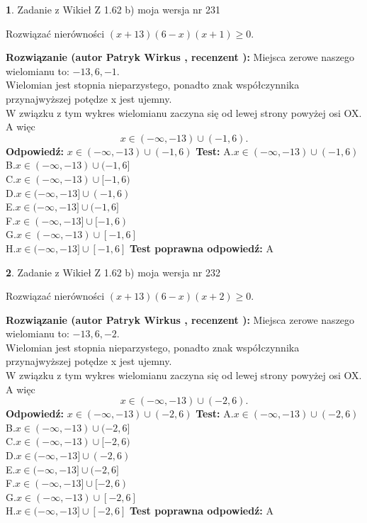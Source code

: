 \documentclass[12pt, a4paper]{article}
\theoremstyle{definition} %
\newtheorem{zad}{}
\newcommand{\zadStart}[1]{\begin{zad}#1\newline}
\newcommand{\zadStop}{\end{zad}}
\newcommand{\rozwStart}[2]{\noindent \textbf{Rozwiązanie (autor #1 , recenzent #2): }\newline}
\newcommand{\rozwStop}{\newline}
\newcommand{\odpStart}{\noindent \textbf{Odpowiedź:}\newline}
\newcommand{\odpStop}{\newline}
\newcommand{\testStart}{\noindent \textbf{Test:}\newline}
\newcommand{\testStop}{\newline}
\newcommand{\kluczStart}{\noindent \textbf{Test poprawna odpowiedź:}\newline}
\newcommand{\kluczStop}{\newline}
\begin{document}
\zadStart{Zadanie z Wikieł Z 1.62 b) moja wersja nr 231}

Rozwiązać nierówności $(x+13)(6-x)(x+1)\ge0$.
\zadStop
\rozwStart{Patryk Wirkus}{}
Miejsca zerowe naszego wielomianu to: $-13, 6, -1$.\\
Wielomian jest stopnia nieparzystego, ponadto znak współczynnika przy\linebreak najwyższej potędze x jest ujemny.\\ W związku z tym wykres wielomianu zaczyna się od lewej strony powyżej osi OX. A więc $$x \in (-\infty,-13) \cup (-1,6).$$
\rozwStop
\odpStart
$x \in (-\infty,-13) \cup (-1,6)$
\odpStop
\testStart
A.$x \in (-\infty,-13) \cup (-1,6)$\\
B.$x \in (-\infty,-13) \cup (-1,6]$\\
C.$x \in (-\infty,-13) \cup [-1,6)$\\
D.$x \in (-\infty,-13] \cup (-1,6)$\\
E.$x \in (-\infty,-13] \cup (-1,6]$\\
F.$x \in (-\infty,-13] \cup [-1,6)$\\
G.$x \in (-\infty,-13) \cup [-1,6]$\\
H.$x \in (-\infty,-13] \cup [-1,6]$
\testStop
\kluczStart
A
\kluczStop



\zadStart{Zadanie z Wikieł Z 1.62 b) moja wersja nr 232}

Rozwiązać nierówności $(x+13)(6-x)(x+2)\ge0$.
\zadStop
\rozwStart{Patryk Wirkus}{}
Miejsca zerowe naszego wielomianu to: $-13, 6, -2$.\\
Wielomian jest stopnia nieparzystego, ponadto znak współczynnika przy\linebreak najwyższej potędze x jest ujemny.\\ W związku z tym wykres wielomianu zaczyna się od lewej strony powyżej osi OX. A więc $$x \in (-\infty,-13) \cup (-2,6).$$
\rozwStop
\odpStart
$x \in (-\infty,-13) \cup (-2,6)$
\odpStop
\testStart
A.$x \in (-\infty,-13) \cup (-2,6)$\\
B.$x \in (-\infty,-13) \cup (-2,6]$\\
C.$x \in (-\infty,-13) \cup [-2,6)$\\
D.$x \in (-\infty,-13] \cup (-2,6)$\\
E.$x \in (-\infty,-13] \cup (-2,6]$\\
F.$x \in (-\infty,-13] \cup [-2,6)$\\
G.$x \in (-\infty,-13) \cup [-2,6]$\\
H.$x \in (-\infty,-13] \cup [-2,6]$
\testStop
\kluczStart
A
\kluczStop
\end{document}
